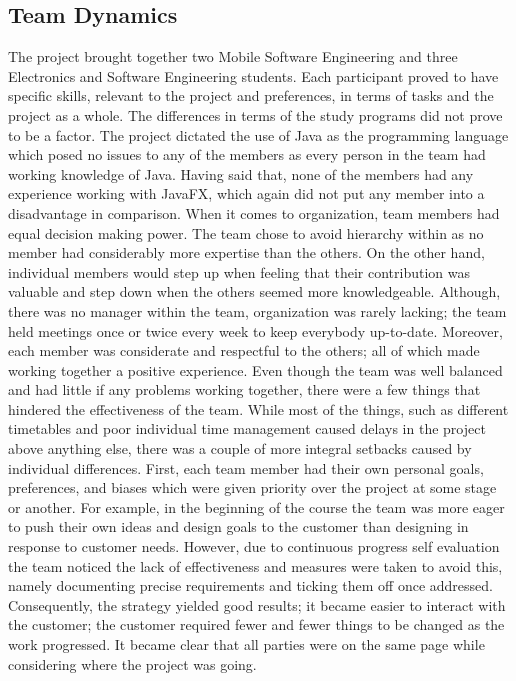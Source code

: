 \documentclass{l3proj}
\begin{document}
\subsection{Team Dynamics}
The project brought together two Mobile Software Engineering and three Electronics and Software Engineering students. Each participant proved to have specific skills, relevant to the project and preferences, in terms of tasks and the project as a whole. The differences in terms of the study programs did not prove to be a factor. The project dictated the use of Java as the programming language which posed no issues to any of the members as every person in the team had working knowledge of Java. Having said that, none of the members had any experience working with JavaFX, which again did not put any member into a disadvantage in comparison.
When it comes to organization, team members had equal decision making power. The team chose to avoid hierarchy within as no member had considerably more expertise than the others. On the other hand, individual members would step up when feeling that their contribution was valuable and step down when the others seemed more knowledgeable. Although, there was no manager within the team, organization was rarely lacking; the team held meetings once or twice every week to keep everybody up-to-date. Moreover, each member was considerate and respectful to the others; all of which made working together a positive experience.
Even though the team was well balanced and had little if any problems working together, there were a few things that hindered the effectiveness of the team. While most of the things, such as different timetables and poor individual time management caused delays in the project above anything else, there was a couple of more integral setbacks caused by individual differences. First, each team member had their own personal goals, preferences, and biases which were given priority over the project at some stage or another. For example, in the beginning of the course the team was more eager to push their own ideas and design goals to the customer than designing in response to customer needs. However, due to continuous progress self evaluation the team noticed the lack of effectiveness and measures were taken to avoid this, namely documenting precise requirements and ticking them off once addressed. Consequently, the strategy yielded good results; it became easier to interact with the customer; the customer required fewer and fewer things to be changed as the work progressed. It became clear that all parties were on the same page while considering where the project was going.
\end{document}

